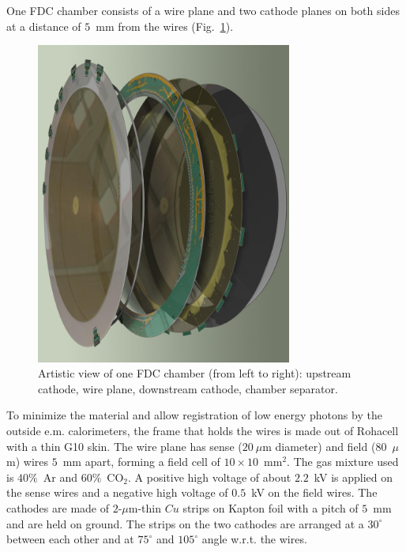 One FDC chamber consists of a wire plane and two cathode planes on both sides at a distance of $5$~mm from the wires (Fig.~\ref{FDC_OneCell}).
\begin{figure}[tbp]
\begin{center}
\includegraphics[width=0.75\textwidth]{figures/FDC_OneCell.jpg}  
\caption{\label{FDC_OneCell}
Artistic view of one FDC chamber (from left to right): upstream cathode, wire plane, downstream cathode, chamber separator.
}
\end{center}
\end{figure}
To minimize the material and allow registration of low energy photons by the outside e.m. calorimeters,
the frame that holds the wires is made out of Rohacell with a thin G10 skin.
The wire plane has sense ($20~\mu$m diameter) and field ($80$~$\mu$m) wires $5$~mm apart, forming a field cell of $10\times 10$~mm$^2$. 
The gas mixture used is $40\%$~Ar and $60\%$~CO$_2$.
A positive high voltage of about $2.2$~kV is applied on the sense wires and a negative high voltage of $0.5$~kV on the field wires. 
The cathodes are made of $2$-$\mu$m-thin $Cu$ strips on Kapton foil with a pitch of $5$~mm and are held on ground. The strips on the two cathodes are arranged at a $30^\circ $ between each other and at $75^\circ $ and $105^\circ $ angle w.r.t. the wires.

